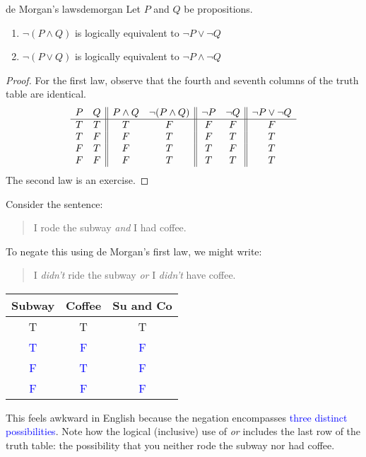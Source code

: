 \begin{thm}{de Morgan's laws}{demorgan}
	Let $P$ and $Q$ be propositions.
	\begin{enumerate}\itemsep0pt
	  \item $\neg(P\wedge Q)$ is logically equivalent to $\neg P\vee\neg Q$
	  \item $\neg(P\vee Q)$ is logically equivalent to $\neg P\wedge\neg Q$
	\end{enumerate}
\end{thm}

\begin{proof}
	For the first law, observe that the fourth and seventh columns of the truth table are identical.
	\[
		\begin{array}[t]{cc||cc||cc||c}
			P & Q & P\wedge Q & \neg(P\wedge Q) & \neg P & \neg Q & \neg P\vee\neg Q\\\hline
			T & T & T & F & F & F & F\\
			T & F & F & T & F & T & T\\
			F & T & F & T & T & F & T\\
			F & F & F & T & T & T & T
		\end{array}
	\]
	The second law is an exercise.
\end{proof}

\begin{example}{}{}
	Consider the sentence:\par
	\begin{minipage}[t]{0.6\linewidth}\vspace{-1pt}
	\begin{quote}
		I rode the subway \emph{and} I had coffee.
	\end{quote}
	To negate this using de Morgan's first law, we might write:
	\begin{quote}
		I \emph{didn't} ride the subway \emph{or} I \emph{didn't} have coffee.
	\end{quote}
	\end{minipage}
	\hfill
	\begin{minipage}[t]{0.39\linewidth}\vspace{-20pt}
		\flushright	
		\begin{tabular}{c|c||c}
			Subway&Coffee&Su and Co\\\hline\hline
			T & T & T\\
			\textcolor{blue}{T} & \textcolor{blue}{F} & \textcolor{blue}{F}\\
			\textcolor{blue}{F} & \textcolor{blue}{T} & \textcolor{blue}{F}\\
			\textcolor{blue}{F} & \textcolor{blue}{F} &\textcolor{blue}{F}
		\end{tabular}
	\end{minipage}\bigbreak
	
	This feels awkward in English because the negation encompasses \textcolor{blue}{three distinct possibilities}. Note how the logical (inclusive) use of \emph{or} includes the last row of the truth table: the possibility that you neither rode the subway nor had coffee.
\end{example}

